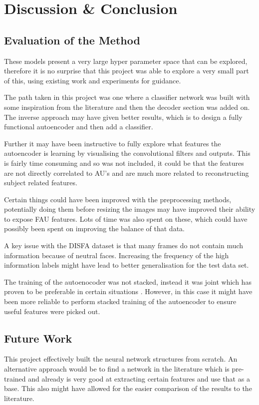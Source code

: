 \chapter{Discussion \& Conclusion}

  \section{Evaluation of the Method}
    These models present a very large hyper parameter space that can be explored, therefore
    it is no surprise that this project was able to explore a very small part of this, using
    existing work and experiments for guidance.

    The path taken in this project was one where a classifier network was built
    with some inspiration from the literature and then the decoder section was added on.
    The inverse approach may have given better results, which is to design a fully functional
    autoencoder and then add a classifier.

    Further it may have been instructive to fully explore what features the autoencoder is learning
    by visualising the convolutional filters and outputs. This is fairly time consuming and
    so was not included, it could be that the features are not directly correlated to AU's and
    are much more related to reconstructing subject related features.

    Certain things could have been improved with the preprocessing methods,
    potentially doing them before resizing the images may have improved their
    ability to expose FAU features. Lots of time was also spent on these, which could have
    possibly been spent on improving the balance of that data.

    A key issue with the DISFA dataset is that many frames do not contain much information
    because of neutral faces. Increasing the frequency of the high information labels
    might have lead to better generalisation for the test data set.

    The training of the autoenocoder was not stacked, instead it was joint which has
    proven to be preferable in certain situations \cite{Zhou2014}. However, in this case
    it might have been more reliable to perform stacked training of the autoencoder to ensure
    useful features were picked out.

  \section{Future Work}
    This project effectively built the neural network structures from scratch.
    An alternative approach would be to find a network in the literature which is pre-trained
    and already is very good at extracting certain features and use that as a base.
    This also might have allowed for the easier comparison of the results to the literature.

